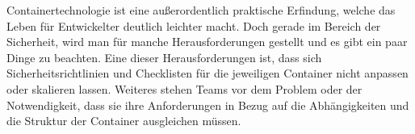 
Containertechnologie ist eine außerordentlich praktische Erfindung, welche das Leben für Entwickelter deutlich leichter macht. Doch gerade im Bereich der Sicherheit, wird man für manche Herausforderungen gestellt und es gibt ein paar Dinge zu beachten. 
Eine dieser Herausforderungen ist, dass sich Sicherheitsrichtlinien und Checklisten für die jeweiligen Container nicht anpassen oder skalieren lassen. Weiteres stehen Teams vor dem Problem oder der Notwendigkeit, dass sie ihre Anforderungen in Bezug auf die Abhängigkeiten und die Struktur der Container ausgleichen müssen.
